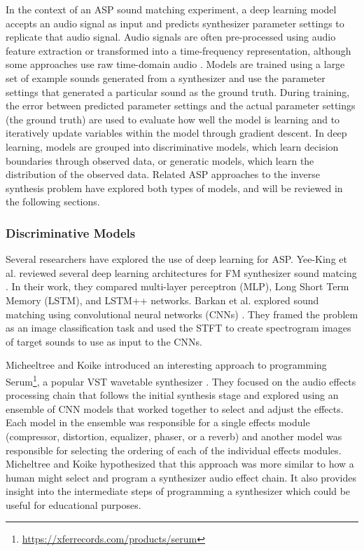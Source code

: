 In the context of an ASP sound matching experiment, a deep learning model accepts an audio signal as input and predicts synthesizer parameter settings to replicate that audio signal. Audio signals are often pre-processed using audio feature extraction or transformed into a time-frequency representation, although some approaches use raw time-domain audio \cite{barkan2019inversynth}. Models are trained using a large set of example sounds generated from a synthesizer and use the parameter settings that generated a particular sound as the ground truth. During training, the error between predicted parameter settings and the actual parameter settings (the ground truth) are used to evaluate how well the model is learning and to iteratively update variables within the model through gradient descent. In deep learning, models are grouped into discriminative models, which learn decision boundaries through observed data, or generatic models, which learn the distribution of the observed data. Related ASP approaches to the inverse synthesis problem have explored both types of models, and will be reviewed in the following sections.

\subsubsection{Discriminative Models}

Several researchers have explored the use of deep learning for ASP. Yee-King et al. reviewed several deep learning architectures for FM synthesizer sound matcing \cite{yee2018automatic}. In their work, they compared multi-layer perceptron (MLP), Long Short Term Memory (LSTM), and LSTM++ networks. Barkan et al. explored sound matching using convolutional neural networks (CNNs) \cite{barkan2019deep, barkan2019inversynth}. They framed the problem as an image classification task and used the STFT to create spectrogram images of target sounds to use as input to the CNNs.


Micheeltree and Koike introduced an interesting approach to programming Serum\footnote{\url{https://xferrecords.com/products/serum}}, a popular VST wavetable synthesizer \cite{mitcheltree2021serumrnn}. They focused on the audio effects processing chain that follows the initial synthesis stage and explored using an ensemble of CNN models that worked together to select and adjust the effects. Each model in the ensemble was responsible for a single effects module (compressor, distortion, equalizer, phaser, or a reverb) and another model was responsible for selecting the ordering of each of the individual effects modules. Micheltree and Koike hypothesized that this approach was more similar to how a human might select and program a synthesizer audio effect chain. It also provides insight into the intermediate steps of programming a synthesizer which could be useful for educational purposes.



